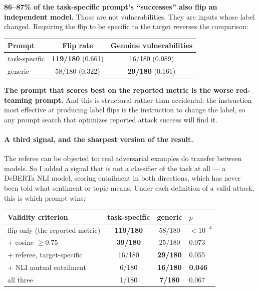\documentclass[11pt]{article}
\begin{document}
\noindent \textbf{86--87\% of the task-specific prompt's ``successes'' also flip an
independent model.} Those are not vulnerabilities. They are inputs whose label
changed. Requiring the flip to be specific to the target reverses the comparison:

\begin{center}
\begin{tabular}{lcc}
\toprule
Prompt & Flip rate & Genuine vulnerabilities \\
\midrule
task-specific & \textbf{119/180} (0.661) & 16/180 (0.089) \\
generic       & 58/180 (0.322) & \textbf{29/180} (0.161) \\
\bottomrule
\end{tabular}
\end{center}

\noindent \textbf{The prompt that scores best on the reported metric is the worse
red-teaming prompt.} And this is structural rather than accidental: the instruction
most effective at producing label flips is the instruction to change the label, so
any prompt search that optimizes reported attack success will find it.

\paragraph{A third signal, and the sharpest version of the result.}
The referee can be objected to: real adversarial examples do transfer between
models. So I added a signal that is not a classifier of the task at all --- a
DeBERTa NLI model, scoring entailment in both directions, which has never been
told what sentiment or topic means. Under each definition of a valid attack, this
is which prompt wins:

\begin{center}
\begin{tabular}{lccl}
\toprule
Validity criterion & task-specific & generic & $p$ \\
\midrule
flip only (the reported metric) & \textbf{119/180} & 58/180 & $<10^{-4}$ \\
\; + cosine $\geq 0.75$         & \textbf{39/180}  & 25/180 & 0.073 \\
\; + referee, target-specific   & 16/180 & \textbf{29/180} & 0.055 \\
\; + NLI mutual entailment      &  6/180 & \textbf{16/180} & \textbf{0.046} \\
\; all three                    &  1/180 &  \textbf{7/180} & 0.067 \\
\bottomrule
\end{tabular}
\end{center}
\end{document}
